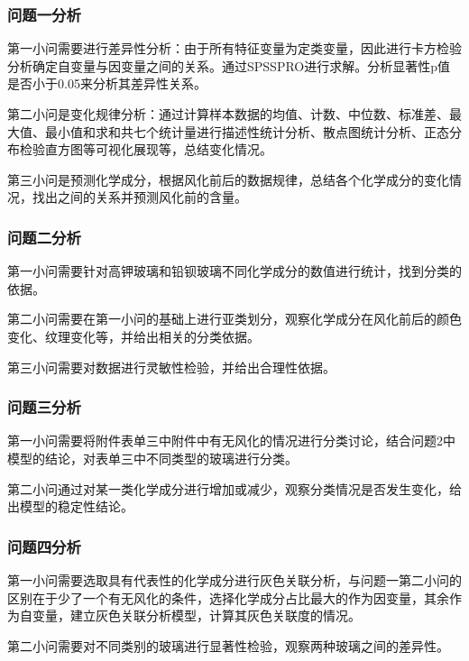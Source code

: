 \subsubsection{问题一分析}
第一小问需要进行差异性分析：由于所有特征变量为定类变量，因此进行卡方检验分析确定自变量与因变量之间的关系。通过SPSSPRO进行求解。分析显著性p值是否小于0.05来分析其差异性关系。

第二小问是变化规律分析：通过计算样本数据的均值、计数、中位数、标准差、最大值、最小值和求和共七个统计量进行描述性统计分析、散点图统计分析、正态分布检验直方图等可视化展现等，总结变化情况。

第三小问是预测化学成分，根据风化前后的数据规律，总结各个化学成分的变化情况，找出之间的关系并预测风化前的含量。

\subsubsection{问题二分析}
第一小问需要针对高钾玻璃和铅钡玻璃不同化学成分的数值进行统计，找到分类的依据。

第二小问需要在第一小问的基础上进行亚类划分，观察化学成分在风化前后的颜色变化、纹理变化等，并给出相关的分类依据。

第三小问需要对数据进行灵敏性检验，并给出合理性依据。

\subsubsection{问题三分析}
第一小问需要将附件表单三中附件中有无风化的情况进行分类讨论，结合问题2中模型的结论，对表单三中不同类型的玻璃进行分类。

第二小问通过对某一类化学成分进行增加或减少，观察分类情况是否发生变化，给出模型的稳定性结论。

\subsubsection{问题四分析}
第一小问需要选取具有代表性的化学成分进行灰色关联分析，与问题一第二小问的区别在于少了一个有无风化的条件，选择化学成分占比最大的作为因变量，其余作为自变量，建立灰色关联分析模型，计算其灰色关联度的情况。

第二小问需要对不同类别的玻璃进行显著性检验，观察两种玻璃之间的差异性。